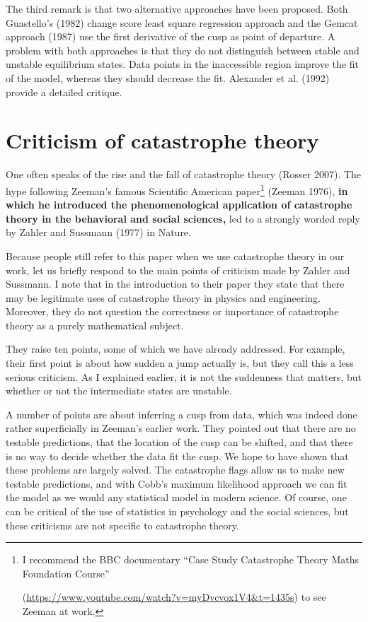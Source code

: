 \documentclass[
  letterpaper,
]{scrbook}
\begin{document}
The third remark is that two alternative approaches have been proposed.
Both Guastello's (1982) change score least square regression approach
and the Gemcat approach (1987) use the first derivative of the cusp as
point of departure. A problem with both approaches is that they do not
distinguish between stable and unstable equilibrium states. Data points
in the inaccessible region improve the fit of the model, whereas they
should decrease the fit. Alexander et al. (1992) provide a detailed
critique.

\hypertarget{criticism-of-catastrophe-theory}{%
\section{Criticism of catastrophe
theory}\label{criticism-of-catastrophe-theory}}

One often speaks of the rise and the fall of catastrophe theory (Rosser
2007). The hype following Zeeman's famous Scientific American
paper\footnote{I recommend the BBC documentary ``Case Study Catastrophe
  Theory Maths Foundation Course''

  (\url{https://www.youtube.com/watch?v=myDvcvox1V4\&t=1435s}) to see
  Zeeman at work.} (Zeeman 1976), \textbf{in which he introduced the
phenomenological application of catastrophe theory in the behavioral and
social sciences,} led to a strongly worded reply by Zahler and Sussmann
(1977) in Nature.

Because people still refer to this paper when we use catastrophe theory
in our work, let us briefly respond to the main points of criticism made
by Zahler and Sussmann. I note that in the introduction to their paper
they state that there may be legitimate uses of catastrophe theory in
physics and engineering. Moreover, they do not question the correctness
or importance of catastrophe theory as a purely mathematical subject.

They raise ten points, some of which we have already addressed. For
example, their first point is about how sudden a jump actually is, but
they call this a less serious criticism. As I explained earlier, it is
not the suddenness that matters, but whether or not the intermediate
states are unstable.

A number of points are about inferring a cusp from data, which was
indeed done rather superficially in Zeeman's earlier work. They pointed
out that there are no testable predictions, that the location of the
cusp can be shifted, and that there is no way to decide whether the data
fit the cusp. We hope to have shown that these problems are largely
solved. The catastrophe flags allow us to make new testable predictions,
and with Cobb's maximum likelihood approach we can fit the model as we
would any statistical model in modern science. Of course, one can be
critical of the use of statistics in psychology and the social sciences,
but these criticisms are not specific to catastrophe theory.
\end{document}

